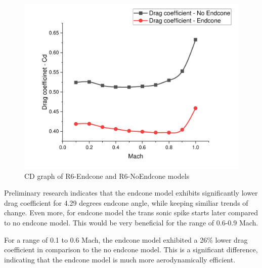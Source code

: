 \documentclass{article}
\begin{document}
\begin{figure}[H]
    \centering
    \includegraphics[width=\textwidth]{../data/DataAnalisysSolid/Solid-Studies-CD-Graph.pdf}
    \caption{CD graph of R6-Endcone and R6-NoEndcone models}
    \label{fig:preliminary}
\end{figure}
Preliminary research indicates that the endcone model exhibits significantly lower drag coefficient
for 4.29 degrees endcone angle, while keeping similiar trends of change. Even more, for endcone model
the trans sonic spike starts later compared to no endcone model. This would be very beneficial for the
range of 0.6-0.9 Mach.  
\begin{table}[H]
    \centering
    \caption{Average values and differences}
\end{table}
For a range of 0.1 to 0.6 Mach, the endcone model exhibited a 26\% lower drag coefficient in 
comparison to the no endcone model. This is a significant difference, indicating that the endcone
model is much more aerodynamically efficient.
\newpage
\end{document}
